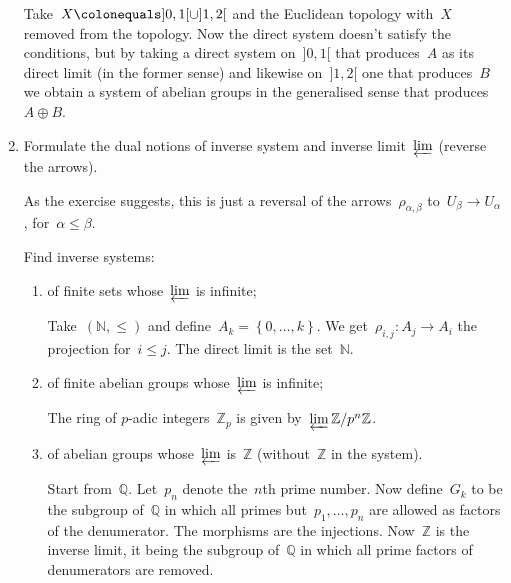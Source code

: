 \documentclass[a4paper,11pt,oneside,openany,article]{memoir}
\begin{document}
\begin{enumerate}
    \begin{solution}
      Take~$X\colonequals]0,1[\cup]1,2[$ and the Euclidean topology with~$X$ removed from the topology. Now the direct system doesn't satisfy the conditions, but by taking a direct system on~$]0,1[$ that produces~$A$ as its direct limit (in the former sense) and likewise on~$]1,2[$ one that produces~$B$ we obtain a system of abelian groups in the generalised sense that produces~$A\oplus B$.
    \end{solution}

  \item Formulate the dual notions of inverse system and inverse limit~$\varprojlim$ (reverse the arrows).

    \begin{solution}
      As the exercise suggests, this is just a reversal of the arrows~$\rho_{\alpha,\beta}$ to~$U_\beta\to U_\alpha$, for~$\alpha\leq\beta$.
    \end{solution}
    
    Find inverse systems:
    \begin{enumerate}
      \item of finite sets whose~$\varprojlim$ is infinite;

        \begin{solution}
          Take~$(\mathbb{N},\leq)$ and define~$A_k=\left\{ 0,\ldots,k \right\}$. We get~$\rho_{i,j}\colon A_j\to A_i$ the projection for~$i\leq j$. The direct limit is the set~$\mathbb{N}$.
        \end{solution}

      \item of finite abelian groups whose~$\varprojlim$ is infinite;

        \begin{solution}
          The ring of $p$\nobreakdash-adic integers~$\mathbb{Z}_p$ is given by~$\varprojlim\mathbb{Z}/p^n\mathbb{Z}$.
        \end{solution}

      \item of abelian groups whose~$\varprojlim$ is~$\mathbb{Z}$ (without~$\mathbb{Z}$ in the system).

        \begin{solution}
          Start from~$\mathbb{Q}$. Let~$p_n$ denote the~$n$th prime number. Now define~$G_k$ to be the subgroup of~$\mathbb{Q}$ in which all primes but~$p_1,\ldots,p_n$ are allowed as factors of the denumerator. The morphisms are the injections. Now~$\mathbb{Z}$ is the inverse limit, it being the subgroup of~$\mathbb{Q}$ in which all prime factors of denumerators are removed.
        \end{solution}
    \end{enumerate}


\end{enumerate}
\end{document}
